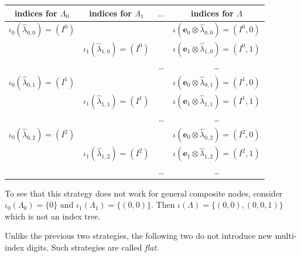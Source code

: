 \documentclass[a4paper,10pt,headings=normal,bibliography=totoc]{scrartcl}
\begin{document}
\begin{itemize}
    \begin{center}
    \begin{tabular}{c|c|c|c}
      indices for $\Lambda_0$ &
      indices for $\Lambda_1$ &
      \hspace{2em}$\dots$\hspace{2em} &
      indices for $\Lambda$ \\
      \hline
      $\iota_0(\hat{\lambda}_{0,0}) = (I^0)$ & & &
        $\iota(\mathbf{e}_0 \otimes \hat{\lambda}_{0,0}) = (I^0,0)$ \\
      & $\iota_1(\hat{\lambda}_{1,0}) = (I^0)$ & &
        $\iota(\mathbf{e}_1 \otimes \hat{\lambda}_{1,0}) = (I^0,1)$ \\
      & & \dots &
        \dots \\
      $\iota_0(\hat{\lambda}_{0,1}) = (I^1)$ & & &
        $\iota(\mathbf{e}_0 \otimes \hat{\lambda}_{0,1}) = (I^1,0)$ \\
      & $\iota_1(\hat{\lambda}_{1,1}) = (I^1)$ & &
        $\iota(\mathbf{e}_1 \otimes \hat{\lambda}_{1,1}) = (I^1,1)$ \\
      & & \dots &
        \dots \\
      $\iota_0(\hat{\lambda}_{0,2}) = (I^2)$ & & &
        $\iota(\mathbf{e}_0 \otimes \hat{\lambda}_{0,2}) = (I^2,0)$ \\
      & $\iota_1(\hat{\lambda}_{1,2}) = (I^2)$ & &
        $\iota(\mathbf{e}_1 \otimes \hat{\lambda}_{1,2}) = (I^2,1)$ \\
      & & \dots &
        \dots \\
    \end{tabular}
    \end{center}

    To see that this strategy does not work for general composite nodes,
    consider $\iota_0(\Lambda_0) = \{0\}$ and $\iota_1(\Lambda_1) = \{(0,0)\}$.
    Then $\iota(\Lambda) = \{(0,0), (0,0,1)\}$ which is not an index tree.
\end{itemize}
Unlike the previous two strategies, the following two do not introduce new
multi-index digits. Such strategies are called \emph{flat}.
\end{document}

